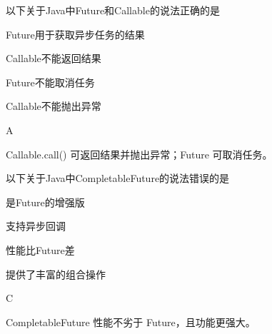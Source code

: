 \begin{question}
	以下关于Java中Future和Callable的说法正确的是
	\begin{options}
		\item Future用于获取异步任务的结果
		\item Callable不能返回结果
		\item Future不能取消任务
		\item Callable不能抛出异常
	\end{options}
	\begin{answer}
		A
	\end{answer}
	\begin{explanation}
		Callable.call() 可返回结果并抛出异常；Future 可取消任务。
	\end{explanation}
\end{question}

\begin{question}
	以下关于Java中CompletableFuture的说法错误的是
	\begin{options}
		\item 是Future的增强版
		\item 支持异步回调
		\item 性能比Future差
		\item 提供了丰富的组合操作
	\end{options}
	\begin{answer}
		C
	\end{answer}
	\begin{explanation}
		CompletableFuture 性能不劣于 Future，且功能更强大。
	\end{explanation}
\end{question}
